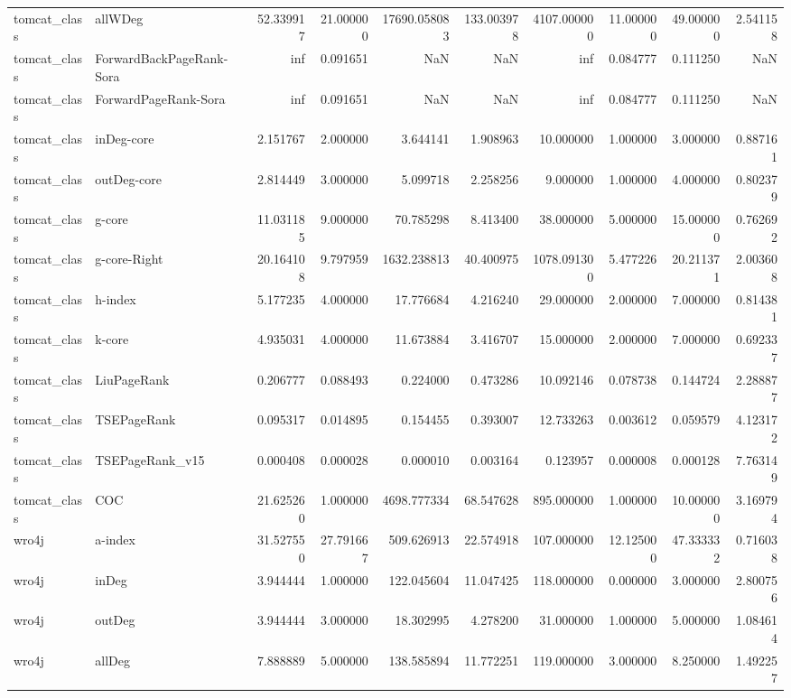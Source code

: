 \begin{tabular}{llrrrrrrrr}
tomcat_class & allWDeg & 52.339917 & 21.000000 & 17690.058083 & 133.003978 & 4107.000000 & 11.000000 & 49.000000 & 2.541158 \\
tomcat_class & ForwardBackPageRank-Sora & inf & 0.091651 & NaN & NaN & inf & 0.084777 & 0.111250 & NaN \\
tomcat_class & ForwardPageRank-Sora & inf & 0.091651 & NaN & NaN & inf & 0.084777 & 0.111250 & NaN \\
tomcat_class & inDeg-core & 2.151767 & 2.000000 & 3.644141 & 1.908963 & 10.000000 & 1.000000 & 3.000000 & 0.887161 \\
tomcat_class & outDeg-core & 2.814449 & 3.000000 & 5.099718 & 2.258256 & 9.000000 & 1.000000 & 4.000000 & 0.802379 \\
tomcat_class & g-core & 11.031185 & 9.000000 & 70.785298 & 8.413400 & 38.000000 & 5.000000 & 15.000000 & 0.762692 \\
tomcat_class & g-core-Right & 20.164108 & 9.797959 & 1632.238813 & 40.400975 & 1078.091300 & 5.477226 & 20.211371 & 2.003608 \\
tomcat_class & h-index & 5.177235 & 4.000000 & 17.776684 & 4.216240 & 29.000000 & 2.000000 & 7.000000 & 0.814381 \\
tomcat_class & k-core & 4.935031 & 4.000000 & 11.673884 & 3.416707 & 15.000000 & 2.000000 & 7.000000 & 0.692337 \\
tomcat_class & LiuPageRank & 0.206777 & 0.088493 & 0.224000 & 0.473286 & 10.092146 & 0.078738 & 0.144724 & 2.288877 \\
tomcat_class & TSEPageRank & 0.095317 & 0.014895 & 0.154455 & 0.393007 & 12.733263 & 0.003612 & 0.059579 & 4.123172 \\
tomcat_class & TSEPageRank_v15 & 0.000408 & 0.000028 & 0.000010 & 0.003164 & 0.123957 & 0.000008 & 0.000128 & 7.763149 \\
tomcat_class & COC & 21.625260 & 1.000000 & 4698.777334 & 68.547628 & 895.000000 & 1.000000 & 10.000000 & 3.169794 \\
wro4j & a-index & 31.527550 & 27.791667 & 509.626913 & 22.574918 & 107.000000 & 12.125000 & 47.333332 & 0.716038 \\
wro4j & inDeg & 3.944444 & 1.000000 & 122.045604 & 11.047425 & 118.000000 & 0.000000 & 3.000000 & 2.800756 \\
wro4j & outDeg & 3.944444 & 3.000000 & 18.302995 & 4.278200 & 31.000000 & 1.000000 & 5.000000 & 1.084614 \\
wro4j & allDeg & 7.888889 & 5.000000 & 138.585894 & 11.772251 & 119.000000 & 3.000000 & 8.250000 & 1.492257 \\

\end{tabular}
